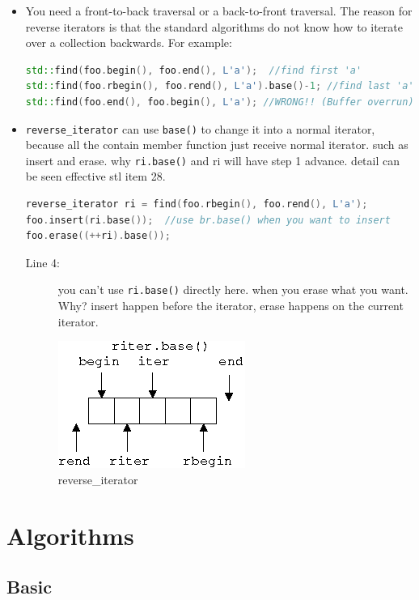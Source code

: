 \documentclass[a4paper,11pt,twoside]{book}
\begin{document}
\begin{itemize}
	\item You need a front-to-back traversal or a back-to-front traversal. The reason for reverse iterators is that the standard algorithms do not know how to iterate over a collection backwards. For example:
\begin{lstlisting}[frame=single, language=c++]
std::find(foo.begin(), foo.end(), L'a');  //find first 'a'
std::find(foo.rbegin(), foo.rend(), L'a').base()-1; //find last 'a'
std::find(foo.end(), foo.begin(), L'a'); //WRONG!! (Buffer overrun)
\end{lstlisting}

	\item \texttt{reverse\_iterator} can use \texttt{base()} to change it into a normal iterator, because all the contain member function just receive normal iterator. such as insert and erase. why \texttt{ri.base()} and ri will have step 1 advance. detail can be seen effective stl item 28.
\begin{lstlisting}[frame=single, language=c++]
reverse_iterator ri = find(foo.rbegin(), foo.rend(), L'a');
foo.insert(ri.base());  //use br.base() when you want to insert                  
foo.erase((++ri).base()); 
\end{lstlisting}
\begin{description}
	\item[Line 4:] you can't use \texttt{ri.base()} directly here. when you erase what you want. Why? insert happen before the iterator, erase happens on the current iterator. 
\end{description}

\begin{figure}[ht]
	\centering
	\includegraphics[width=0.3\linewidth]{pics/ri.png}
	\caption{reverse\_iterator }
	\label{fig:ri}
\end{figure}


\end{itemize}

\section{Algorithms}

\subsection{Basic}
\end{document}
